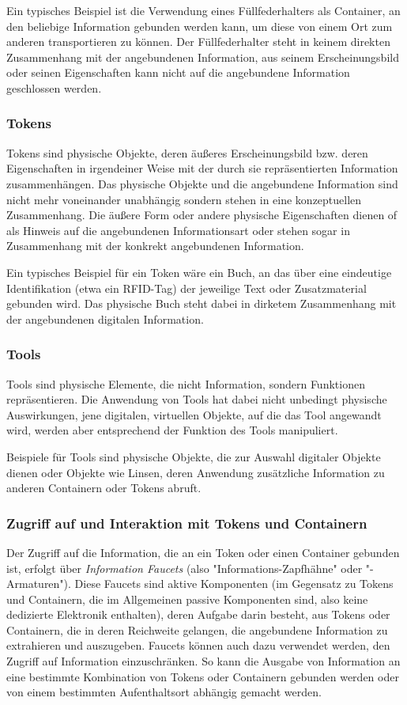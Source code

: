 Ein typisches Beispiel ist die Verwendung eines Füllfederhalters als Container, an den beliebige Information gebunden werden kann, um diese von einem Ort zum anderen transportieren zu können. Der Füllfederhalter steht in keinem direkten Zusammenhang mit der angebundenen Information, aus seinem Erscheinungsbild oder seinen Eigenschaften kann nicht auf die angebundene Information geschlossen werden.

\subsubsection{Tokens}

Tokens sind physische Objekte, deren äußeres Erscheinungsbild bzw. deren Eigenschaften in irgendeiner Weise mit der durch sie repräsentierten Information zusammenhängen. Das physische Objekte und die angebundene Information sind nicht mehr voneinander unabhängig sondern stehen in eine konzeptuellen Zusammenhang. Die äußere Form oder andere physische Eigenschaften dienen of als Hinweis auf die angebundenen Informationsart oder stehen sogar in Zusammenhang mit der konkrekt angebundenen Information.

Ein typisches Beispiel für ein Token wäre ein Buch, an das über eine eindeutige Identifikation (etwa ein \gls{RFID}-Tag) der jeweilige Text oder Zusatzmaterial gebunden wird. Das physische Buch steht dabei in dirketem Zusammenhang mit der angebundenen digitalen Information.

\subsubsection{Tools}
Tools sind physische Elemente, die nicht Information, sondern Funktionen repräsentieren. Die Anwendung von Tools hat dabei nicht unbedingt physische Auswirkungen, jene digitalen, virtuellen Objekte, auf die das Tool angewandt wird, werden aber entsprechend der Funktion des Tools manipuliert.

Beispiele für Tools sind physische Objekte, die zur Auswahl digitaler Objekte dienen oder Objekte wie Linsen, deren Anwendung zusätzliche Information zu anderen Containern oder Tokens abruft.

\subsubsection{Zugriff auf und Interaktion mit Tokens und Containern}

Der Zugriff auf die Information, die an ein Token oder einen Container gebunden ist, erfolgt über \emph{Information Faucets} (also "Informations-Zapfhähne" oder "-Armaturen"). Diese Faucets sind aktive Komponenten (im Gegensatz zu Tokens und Containern, die im Allgemeinen passive Komponenten sind, also keine dedizierte Elektronik enthalten), deren Aufgabe darin besteht, aus Tokens oder Containern, die in deren Reichweite gelangen, die angebundene Information zu extrahieren und auszugeben. Faucets können auch dazu verwendet werden, den Zugriff auf Information einzuschränken. So kann die Ausgabe von Information an eine bestimmte Kombination von Tokens oder Containern gebunden werden oder von einem bestimmten Aufenthaltsort abhängig gemacht werden.

